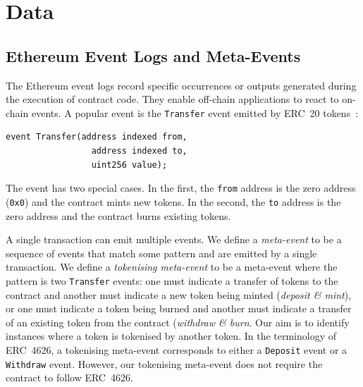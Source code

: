 \section{Data}\label{sec:data}

\subsection{Ethereum Event Logs and Meta-Events}\label{sec:data-event-logs}

The Ethereum event logs record specific occurrences or outputs
generated during the execution of contract code.  They enable
off-chain applications to react to on-chain events.  A popular event
is the \texttt{Transfer} event emitted by ERC~20
tokens~\cite{vogelsteller-buterin-15}:

\begin{lstlisting}[language=Solidity,numbers=none,
    caption={The ERC~20 \texttt{Transfer} event specifies three
      parameters: \texttt{from}, \texttt{to}, and \texttt{value}.}]
  event Transfer(address indexed from,
                 address indexed to,
                 uint256 value);
\end{lstlisting}

The event has two special cases.  In the first, the \texttt{from}
address is the zero address (\texttt{0x0}) and the contract mints new
tokens.  In the second, the \texttt{to} address is the zero address
and the contract burns existing tokens.

A single transaction can emit multiple events.  We define a
\textit{meta-event} to be a sequence of events that match some pattern
and are emitted by a single transaction.  We define a
\textit{tokenising meta-event} to be a meta-event where the pattern is
two \texttt{Transfer} events: one must indicate a transfer of tokens
to the contract and another must indicate a new token being minted
(\textit{deposit \& mint}), or one must indicate a token being burned
and another must indicate a transfer of an existing token from the
contract (\textit{withdraw \& burn}.  Our aim is to identify instances
where a token is tokenised by another token.  In the terminology of
ERC~4626, a tokenising meta-event corresponds to either a
\texttt{Deposit} event or a \texttt{Withdraw} event.  However, our
tokenising meta-event does not require the contract to follow
ERC~4626.

